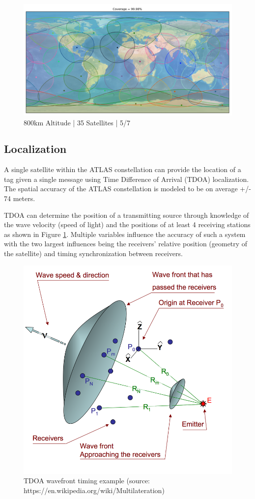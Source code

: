\documentclass{article}
\begin{document}
\begin{figure}[H]
  \centering
  \includegraphics[width=\linewidth]{figures/800km_coverage}
  \caption{800km Altitude | 35 Satellites | 5/7}
\end{figure}

\subsection{Localization}
A single satellite within the ATLAS constellation can provide the location of a tag given a single message using Time Difference of Arrival (TDOA) localization. The spatial accuracy of the ATLAS constellation is modeled to be on average +/- 74 meters. 

TDOA can determine the position of a transmitting source through knowledge of the wave velocity (speed of light) and the positions of at least 4 receiving stations as shown in Figure \ref{fig:tdoa}. Multiple variables influence the accuracy of such a system with the two largest influences being the receivers' relative position (geometry of the satellite) and timing synchronization between receivers. 

\begin{figure}[H]
  \centering
  \includegraphics[width=0.65\linewidth]{figures/TDOA_Geometry}
  \caption{TDOA wavefront timing example (source: https://en.wikipedia.org/wiki/Multilateration)}
\label{fig:tdoa}
\end{figure}
\end{document}

